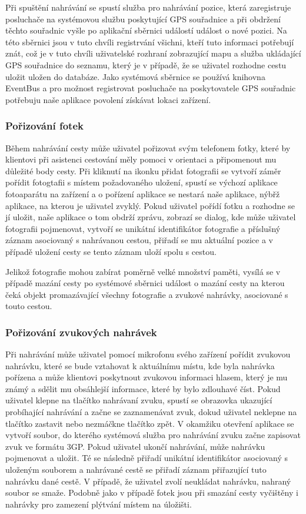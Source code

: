 \documentclass{article}
\begin{document}
Při spuštění nahrávání se spustí služba pro nahrávání pozice, která zaregistruje
posluchače na systémovou službu poskytující GPS souřadnice a při obdržení těchto souřadnic
vyšle po aplikační sběrnici událostí událost o nové pozici. Na této sběrnici jsou v tuto chvíli
registrvání všichni, kteří tuto informaci potřebují znát, což je v tuto chvíli uživatelské rozhraní
zobrazující mapu a služba ukládající GPS souřadnice do seznamu, který je v případě, že se uživatel
rozhodne cestu uložit uložen do databáze. Jako systémová sběrnice se používá knihovna EventBus a pro
možnost registrovat posluchače na poskytovatele GPS souřadnic potřebuju naše aplikace povolení
získávat lokaci zařízení.

\subsubsection{Pořizování fotek}
Během nahrávání cesty může uživatel pořizovat svým telefonem fotky, které by klientovi při asistenci
cestování měly pomoci v orientaci a připomenout mu důležité body cesty. Při kliknutí na ikonku přidat
fotografii se vytvoří záměr pořídit fotogtafii s místem požadovaného uložení, spustí se
výchozí aplikace fotoaparátu na zařízení a o pořízení aplikace se nestará naše
aplikace, nýbřž aplikace, na kterou je uživatel zvyklý. Pokud uživatel pořídí fotku a rozhodne se jí
uložit, naše aplikace o tom obdrží zprávu, zobrazí se dialog, kde může uživatel fotografii pojmenovat,
vytvoří se unikátní identifikátor fotografie a příslušný záznam asociovaný s nahrávanou cestou,
přiřadí se mu aktuální pozice a v případě uložení cesty se tento záznam uloží spolu s cestou.

Jelikož fotografie mohou zabírat poměrně velké množství paměti, vysílá se v případě mazání cesty po
systémové sběrnici událost o mazání cesty na kterou čeká objekt promazávající všechny fotografie
a zvukové nahrávky, asociované s touto cestou.

\subsubsection{Pořizování zvukových nahrávek}
Při nahrávání může uživatel pomocí mikrofonu svého zařízení pořídit zvukovou nahrávku, které se bude
vztahovat k aktuálnímu místu, kde byla nahrávka pořízena a může klientovi poskytnout zvukovou
informaci hlasem, který je mu známý a sdělit mu obsáhlejší informace, které by bylo zdlouhavé číst.
Pokud uživatel klepne na tlačítko nahrávaní zvuku, spustí se obrazovka ukazující probíhající nahrávání
a začne se zaznamenávat zvuk, dokud uživatel neklepne na tlačítko zastavit nebo nezmáčkne tlačítko zpět.
V okamžiku otevření aplikace se vytvoří soubor, do kterého systémová služba pro nahrávání
zvuku začne zapisovat zvuk ve formátu 3GP.
Pokud uživatel ukončí nahrávání, může nahrávku pojmenovat a uložit. Té se následně přiřadí unikátní
identifikátor asociovaný s uloženým souborem a nahrávané cestě se přiřadí záznam přiřazující tuto
nahrávku dané cestě. V případě, že uživatel zvolí neukládat nahrávku, nahraný soubor se smaže.
Podobně jako v případě fotek jsou při smazání cesty vyčištěny i nahrávky pro zamezení plýtvání místem
na úložišti.
\end{document}
